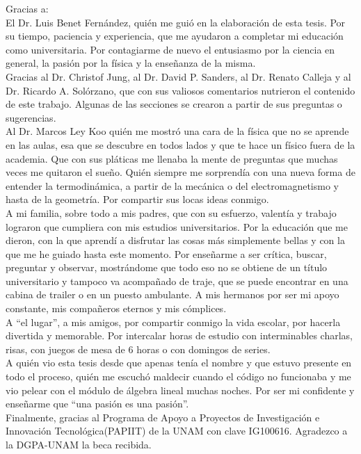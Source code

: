 
\begin{acknowledgements}
Gracias a:\\

El Dr. Luis Benet Fernández, quién me guió en la elaboración de esta tesis. Por su tiempo, paciencia y experiencia, que me ayudaron a completar mi educación como universitaria. Por contagiarme de nuevo el entusiasmo por la ciencia en general, la pasión por la física y la enseñanza de la misma. \\

Gracias al Dr. Christof Jung, al Dr. David P. Sanders, al Dr. Renato Calleja y al Dr. Ricardo A. Solórzano, que con sus valiosos comentarios nutrieron el contenido de este trabajo. Algunas de las secciones se crearon a partir de sus preguntas o sugerencias. \\

Al Dr. Marcos Ley Koo quién me mostró una cara de la física que no se aprende en las aulas, esa que se descubre en todos lados y que te hace un físico fuera de la academia. Que con sus pláticas me llenaba la mente de preguntas que muchas veces me quitaron el sueño. Quién siempre me sorprendía con una nueva forma de entender la termodinámica, a partir de la mecánica o del electromagnetismo y hasta de la geometría. Por compartir sus locas ideas conmigo. \\

A mi familia, sobre todo a mis padres, que con su esfuerzo, valentía y trabajo lograron que cumpliera con mis estudios universitarios. Por la educación que me dieron, con la que aprendí a disfrutar las cosas más simplemente bellas y con la que me he guiado hasta este momento. Por enseñarme a ser crítica, buscar, preguntar y observar, mostrándome que todo eso no se obtiene de un título universitario y tampoco va acompañado de traje, que se puede encontrar en una cabina de trailer o en un puesto ambulante. A mis hermanos por ser mi apoyo constante, mis compañeros eternos y mis cómplices.\\

A \textquotedblleft el lugar\textquotedblright, a mis amigos, por compartir conmigo la vida escolar, por hacerla divertida y memorable. Por intercalar horas de estudio con interminables charlas, risas, con juegos de mesa de 6 horas o con domingos de series.\\

A quién vio esta tesis desde que apenas tenía el nombre y que estuvo presente en todo el proceso, quién me escuchó maldecir cuando el código no funcionaba y me vio pelear con el módulo de álgebra lineal muchas noches. Por ser mi confidente y enseñarme que \textquotedblleft una pasión es una pasión\textquotedblright.\\

Finalmente, gracias al Programa de Apoyo a Proyectos de Investigación e Innovación Tecnológica(PAPIIT) de la UNAM con clave IG100616. Agradezco a la DGPA-UNAM la beca recibida.

\end{acknowledgements}




